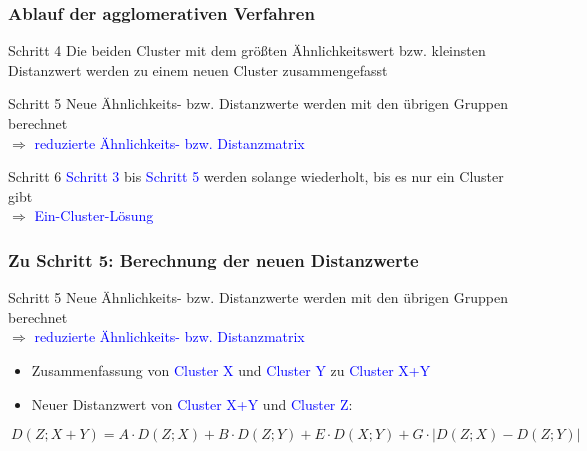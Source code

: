 \documentclass{beamer}
\begin{document}
\begin{frame}
 \frametitle{Ablauf der agglomerativen Verfahren}
 
 \begin{block}{Schritt 4}
  Die beiden Cluster  mit dem größten Ähnlichkeitswert bzw. kleinsten Distanzwert werden zu einem neuen Cluster zusammengefasst
 \end{block}

 \begin{block}{Schritt 5}
  Neue Ähnlichkeits- bzw. Distanzwerte werden mit den übrigen Gruppen berechnet \\
  $\Rightarrow$ \textcolor{blue}{reduzierte Ähnlichkeits- bzw. Distanzmatrix}
 \end{block}

 \begin{block}{Schritt 6}
  \textcolor{blue}{Schritt 3} bis \textcolor{blue}{Schritt 5} werden solange wiederholt, bis es nur ein Cluster gibt \\
  $\Rightarrow$ \textcolor{blue}{Ein-Cluster-Lösung}
 \end{block}

\end{frame}

\begin{frame}
 \frametitle{Zu Schritt 5: Berechnung der neuen Distanzwerte}

 \begin{block}{Schritt 5}
  Neue Ähnlichkeits- bzw. Distanzwerte werden mit den übrigen Gruppen berechnet \\
  $\Rightarrow$ \textcolor{blue}{reduzierte Ähnlichkeits- bzw. Distanzmatrix}
 \end{block}

 \begin{itemize} 
  \item Zusammenfassung von \textcolor{blue}{Cluster X} und \textcolor{blue}{Cluster Y} zu \textcolor{blue}{Cluster X+Y}
  \item Neuer Distanzwert von \textcolor{blue}{Cluster X+Y} und \textcolor{blue}{Cluster Z}:
 \end{itemize}

 \begin{equation}
  \ D(Z;X+Y)=A\cdot D(Z;X)+B\cdot D(Z;Y)+E\cdot D(X;Y)+G\cdot |D(Z;X)-D(Z;Y)|
 \end{equation}
 

\end{frame}
\end{document}

